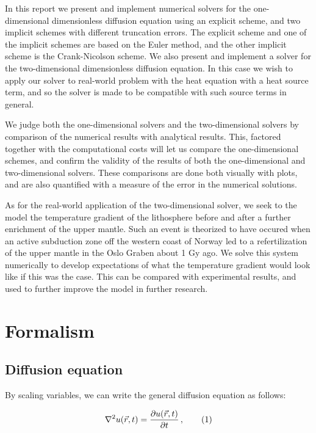 \documentclass[reprint,english,notitlepage]{revtex4-1}  %
\newcommand\numberthis{\addtocounter{equation}{1}\tag{\theequation}}
\begin{document}
In this report we present and implement numerical solvers for the one-dimensional dimensionless diffusion equation using an explicit scheme, and two implicit schemes with different truncation errors. The explicit scheme and one of the implicit schemes are based on the Euler method, and the other implicit scheme is the Crank-Nicolson scheme. We also present and implement a solver for the two-dimensional dimensionless diffusion equation. In this case we wish to apply our solver to real-world problem with the heat equation with a heat source term, and so the solver is made to be compatible with such source terms in general. 

We judge both the one-dimensional solvers and the two-dimensional solvers by comparison of the numerical results with analytical results. This, factored together with the computational costs will let us compare the one-dimensional schemes, and confirm the validity of the results of both the one-dimensional and two-dimensional solvers. These comparisons are done both visually with plots, and are also quantified with a measure of the error in the numerical solutions.

As for the real-world application of the two-dimensional solver, we seek to the model the temperature gradient of the lithosphere before and after a further enrichment of the upper mantle. Such an event is theorized to have occured when an active subduction zone off the western coast of Norway led to a refertilization of the upper mantle in the Oslo Graben about 1 Gy ago. We solve this system numerically to develop expectations of what the temperature gradient would look like if this was the case. This can be compared with experimental results, and used to further improve the model in further research. 


\newpage

\section{Formalism} \label{sec:formalism}

\subsection{Diffusion equation} \label{sec:formalism_diffusion_equation}

By scaling variables, we can write the general diffusion equation as follows:

\begin{align*}
\nabla^2 u(\vec{r},t) = \frac{\partial u(\vec{r},t)}{\partial t} \, , \numberthis \label{eq:3D_diff_eq}
\end{align*}
\end{document}
